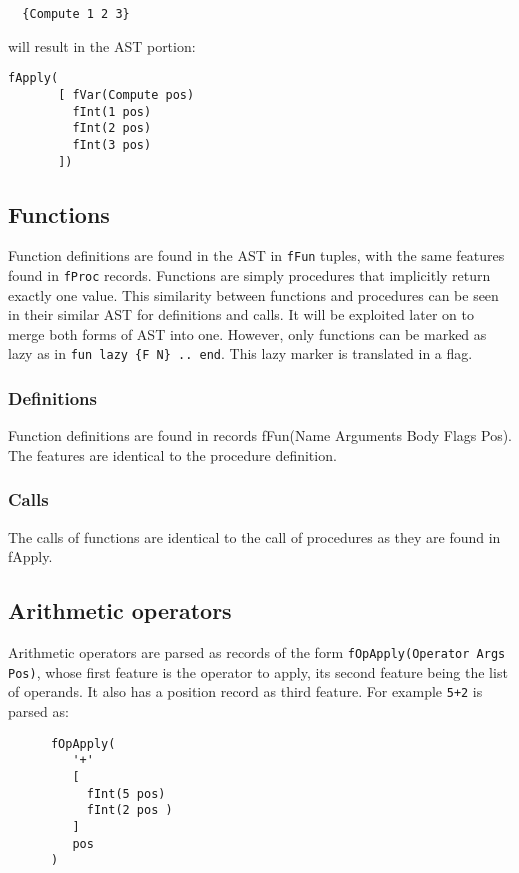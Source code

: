 \documentclass[a4paper]{memoir}
\begin{document}
\begin{lstlisting}
  {Compute 1 2 3}
\end{lstlisting}

will result in the AST portion:
\begin{lstlisting}
fApply(
       [ fVar(Compute pos)
         fInt(1 pos)
         fInt(2 pos)
         fInt(3 pos)
       ])
\end{lstlisting}

\subsection{Functions}\label{sec:input:functions}
Function definitions are found in the AST in \lstinline!fFun! tuples, with the
same features found in \lstinline!fProc! records. Functions are simply
procedures that implicitly return exactly one value. This similarity between
functions and procedures can be seen in their similar AST for definitions and
calls. It will be exploited later on to merge both forms of AST
into one.
However, only functions can be marked as lazy as in \lstinline!fun lazy {F N} .. end!. This lazy marker is translated in a flag.
\subsubsection{Definitions}
Function definitions are found in records fFun(Name Arguments Body Flags Pos). The features are identical to the procedure definition.
\subsubsection{Calls}
The calls of functions are identical to the call of procedures as they are found in fApply.

\subsection{Arithmetic operators}\label{sec:input:operators}
Arithmetic operators are parsed as records of the form
\lstinline!fOpApply(Operator Args Pos)!, whose first feature is the operator to
apply, its second feature being the list of operands. It also has a position
record as third feature. For example
\lstinline!5+2! is parsed as:
\begin{lstlisting}
      fOpApply(
         '+'
         [
           fInt(5 pos)
           fInt(2 pos )
         ]
         pos
      )
\end{lstlisting}
\end{document}

